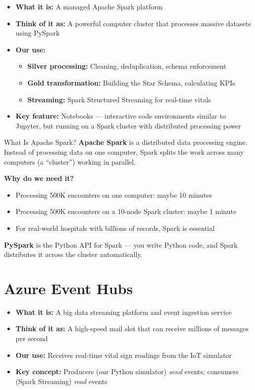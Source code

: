 \documentclass[12pt, a4paper, oneside]{report}
\begin{document}
\begin{itemize}
    \item \textbf{What it is:} A managed Apache Spark platform
    \item \textbf{Think of it as:} A powerful computer cluster that processes massive datasets using PySpark
    \item \textbf{Our use:}
    \begin{itemize}
        \item \textbf{Silver processing:} Cleaning, deduplication, schema enforcement
        \item \textbf{Gold transformation:} Building the Star Schema, calculating KPIs
        \item \textbf{Streaming:} Spark Structured Streaming for real-time vitals
    \end{itemize}
    \item \textbf{Key feature:} Notebooks --- interactive code environments similar to Jupyter, but running on a Spark cluster with distributed processing power
\end{itemize}

\begin{conceptbox}{What Is Apache Spark?}
\textbf{Apache Spark} is a distributed data processing engine. Instead of processing data on one computer, Spark splits the work across many computers (a ``cluster'') working in parallel.

\textbf{Why do we need it?}
\begin{itemize}
    \item Processing 500K encounters on one computer: maybe 10 minutes
    \item Processing 500K encounters on a 10-node Spark cluster: maybe 1 minute
    \item For real-world hospitals with billions of records, Spark is essential
\end{itemize}

\textbf{PySpark} is the Python API for Spark --- you write Python code, and Spark distributes it across the cluster automatically.
\end{conceptbox}

\section{Azure Event Hubs}

\begin{itemize}
    \item \textbf{What it is:} A big data streaming platform and event ingestion service
    \item \textbf{Think of it as:} A high-speed mail slot that can receive millions of messages per second
    \item \textbf{Our use:} Receives real-time vital sign readings from the IoT simulator
    \item \textbf{Key concept:} Producers (our Python simulator) \textit{send} events; consumers (Spark Streaming) \textit{read} events
\end{itemize}
\end{document}
